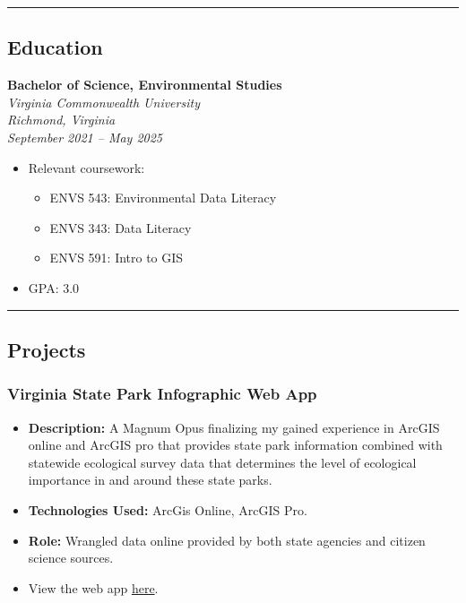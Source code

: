 \documentclass[
  letterpaper,
  DIV=11,
  numbers=noendperiod]{scrartcl}
\providecommand{\tightlist}{%
  \setlength{\itemsep}{0pt}\setlength{\parskip}{0pt}}\usepackage{longtable,booktabs,array}
\begin{document}
\begin{center}\rule{0.5\linewidth}{0.5pt}\end{center}

\subsection{Education}\label{education}

\textbf{Bachelor of Science, Environmental Studies}\\
\emph{Virginia Commonwealth University}\\
\emph{Richmond, Virginia}\\
\emph{September 2021 -- May 2025}

\begin{itemize}
\tightlist
\item
  Relevant coursework:

  \begin{itemize}
  \tightlist
  \item
    ENVS 543: Environmental Data Literacy
  \item
    ENVS 343: Data Literacy
  \item
    ENVS 591: Intro to GIS
  \end{itemize}
\item
  GPA: 3.0
\end{itemize}

\begin{center}\rule{0.5\linewidth}{0.5pt}\end{center}

\subsection{Projects}\label{projects}

\subsubsection{Virginia State Park Infographic Web
App}\label{virginia-state-park-infographic-web-app}

\begin{itemize}
\tightlist
\item
  \textbf{Description:} A Magnum Opus finalizing my gained experience in
  ArcGIS online and ArcGIS pro that provides state park information
  combined with statewide ecological survey data that determines the
  level of ecological importance in and around these state parks.
\item
  \textbf{Technologies Used:} ArcGis Online, ArcGIS Pro.
\item
  \textbf{Role:} Wrangled data online provided by both state agencies
  and citizen science sources.
\item
  View the web app
  \href{https://experience.arcgis.com/experience/abc27eea4625474f944324852a123415}{here}.
\end{itemize}
\end{document}
